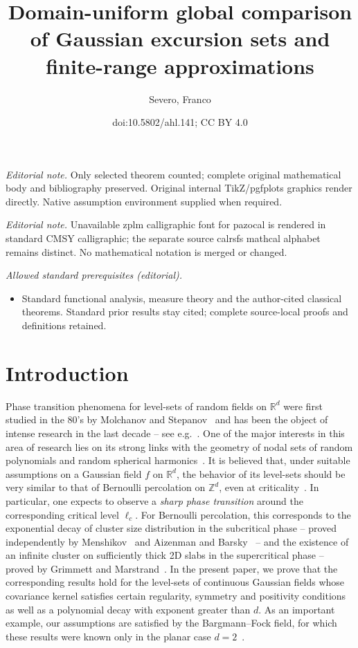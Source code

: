 \documentclass[10pt]{amsart}
\title{Domain-uniform global comparison of Gaussian excursion sets and finite-range approximations}
\author{Severo, Franco}
\date{doi:10.5802/ahl.141; CC BY 4.0}
\theoremstyle{definition}\newtheorem{defi}[theo]{Definition}\newtheorem{rema}[theo]{Remark}\newtheorem{exam}[theo]{Example}\newtheorem{exem}[theo]{Example}\newtheorem{nota}[theo]{Notation}
\newcommand{\R}{\mathbb{R}}
\newcommand{\Z}{\mathbb{Z}}
\begin{document}
\maketitle
\noindent\textit{Editorial note.} Only selected theorem counted; complete original mathematical body and bibliography preserved. Original internal TikZ/pgfplots graphics render directly. Native assumption environment supplied when required.\par\medskip
\noindent\textit{Editorial note.} Unavailable zplm calligraphic font for pazocal is rendered in standard CMSY calligraphic; the separate source calrsfs mathcal alphabet remains distinct. No mathematical notation is merged or changed.\par\medskip
\noindent\textit{Allowed standard prerequisites (editorial).}\begin{itemize}
\item Standard functional analysis, measure theory and the author-cited classical theorems. Standard prior results stay cited; complete source-local proofs and definitions retained.
\end{itemize}\medskip

\section{Introduction}\label{sec:intro}

Phase transition phenomena for level-sets of random fields on $\R^d$ were first studied in the 80's by Molchanov and Stepanov~\cite{MoSt83a, MoSt83b, MoSt86c} and has been the object of intense research in the last decade -- see e.g.~\cite{BG17, BM18,MV, MRV20,RVb}. One of the major interests in this area of research lies on its strong links with the geometry of nodal sets of random polynomials and random spherical harmonics~\cite{An16, NaSo09, CaSa19, Sa1, SaWi19}. It is believed that, under suitable assumptions on a Gaussian field $f$ on $\R^d$, the behavior of its level-sets should be very similar to that of Bernoulli percolation on $\Z^d$, even at criticality~\cite{BogSch02,BogSch07}. In particular, one expects to observe a \emph{sharp phase transition} around the corresponding critical level $\ell_c$. For Bernoulli percolation, this corresponds to the exponential decay of cluster size distribution in the subcritical phase -- proved independently by Menshikov~\cite{Men86} and Aizenman and Barsky~\cite{AizBar87} -- and the existence of an infinite cluster on sufficiently thick 2D slabs in the supercritical phase -- proved by Grimmett and Marstrand~\cite{GriMar90}. In the present paper, we prove that the corresponding results hold for the level-sets of continuous Gaussian fields whose covariance kernel satisfies certain regularity, symmetry and positivity conditions as well as a polynomial decay with exponent greater than $d$. As an important example, our assumptions are satisfied by the Bargmann--Fock field, for which these results were known only in the planar case $d=2$~\cite{RVb}.
\end{document}
